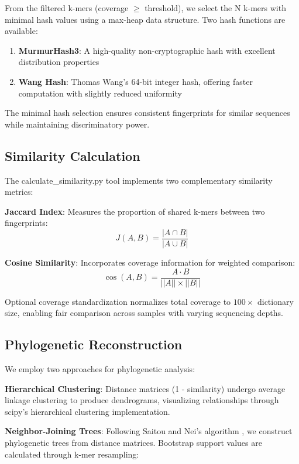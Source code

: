 \documentclass[12pt,a4paper]{article}
\begin{document}
From the filtered k-mers (coverage $\geq$ threshold), we select the N k-mers with minimal hash values using a max-heap data structure. Two hash functions are available:

\begin{enumerate}
\item \textbf{MurmurHash3}: A high-quality non-cryptographic hash with excellent distribution properties
\item \textbf{Wang Hash}: Thomas Wang's 64-bit integer hash, offering faster computation with slightly reduced uniformity
\end{enumerate}

The minimal hash selection ensures consistent fingerprints for similar sequences while maintaining discriminatory power.

\subsection{Similarity Calculation}

The calculate\_similarity.py tool implements two complementary similarity metrics:

\textbf{Jaccard Index}: Measures the proportion of shared k-mers between two fingerprints:
\begin{equation}
J(A,B) = \frac{|A \cap B|}{|A \cup B|}
\end{equation}

\textbf{Cosine Similarity}: Incorporates coverage information for weighted comparison:
\begin{equation}
\cos(A,B) = \frac{A \cdot B}{||A|| \times ||B||}
\end{equation}

Optional coverage standardization normalizes total coverage to $100 \times$ dictionary size, enabling fair comparison across samples with varying sequencing depths.

\subsection{Phylogenetic Reconstruction}

We employ two approaches for phylogenetic analysis:

\textbf{Hierarchical Clustering}: Distance matrices (1 - similarity) undergo average linkage clustering to produce dendrograms, visualizing relationships through scipy's hierarchical clustering implementation.

\textbf{Neighbor-Joining Trees}: Following Saitou and Nei's algorithm \citep{saitou1987neighbor}, we construct phylogenetic trees from distance matrices. Bootstrap support values are calculated through k-mer resampling:
\end{document}
